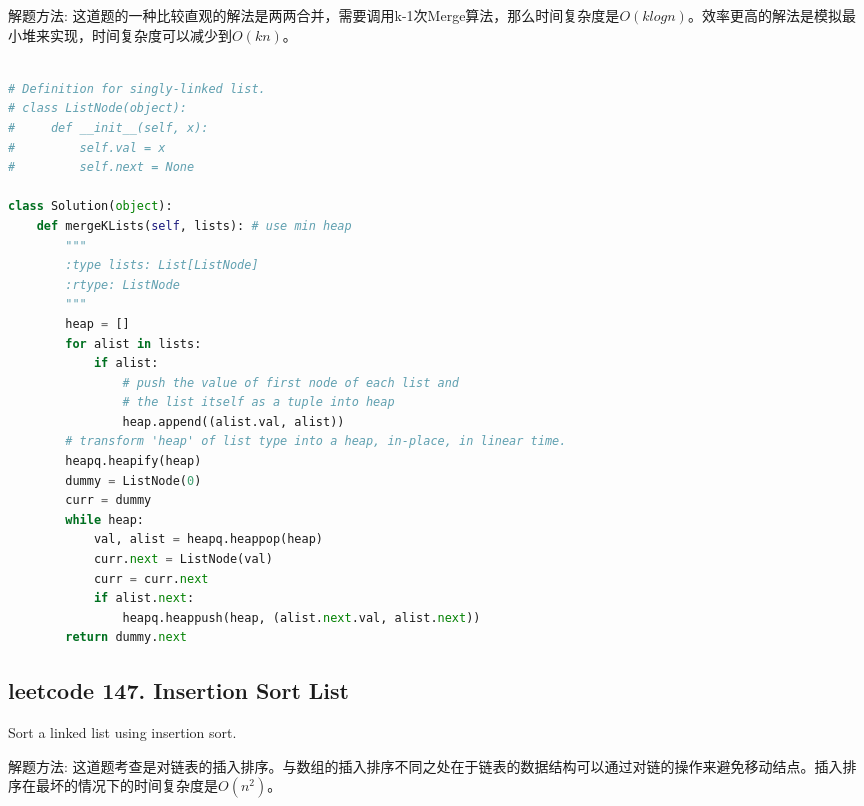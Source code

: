 \documentclass[a4paper,10pt]{article}
\begin{document}
\begin{CJK*}{UTF8}{gbsn}
\noindent 解题方法: 这道题的一种比较直观的解法是两两合并，需要调用k-1次Merge算法，那么时间复杂度是$O(klogn)$。效率更高的解法是模拟最小堆来实现，时间复杂度可以减少到$O(kn)$。
\end{CJK*}

\begin{lstlisting}[language=Python, caption=Problem23. Merge k Sorted Lists]

# Definition for singly-linked list.
# class ListNode(object):
#     def __init__(self, x):
#         self.val = x
#         self.next = None

class Solution(object):
    def mergeKLists(self, lists): # use min heap
        """
        :type lists: List[ListNode]
        :rtype: ListNode
        """
        heap = []
        for alist in lists:
            if alist:
                # push the value of first node of each list and
                # the list itself as a tuple into heap
                heap.append((alist.val, alist))
        # transform 'heap' of list type into a heap, in-place, in linear time.
        heapq.heapify(heap)
        dummy = ListNode(0)
        curr = dummy
        while heap:
            val, alist = heapq.heappop(heap)
            curr.next = ListNode(val)
            curr = curr.next
            if alist.next:
                heapq.heappush(heap, (alist.next.val, alist.next))
        return dummy.next
\end{lstlisting}



\subsection{leetcode 147. Insertion Sort List}
Sort a linked list using insertion sort. \\

\begin{CJK*}{UTF8}{gbsn}
\noindent 解题方法: 这道题考查是对链表的插入排序。与数组的插入排序不同之处在于链表的数据结构可以通过对链的操作来避免移动结点。插入排序在最坏的情况下的时间复杂度是$O(n^2)$。
\end{CJK*}\\
\end{document}
